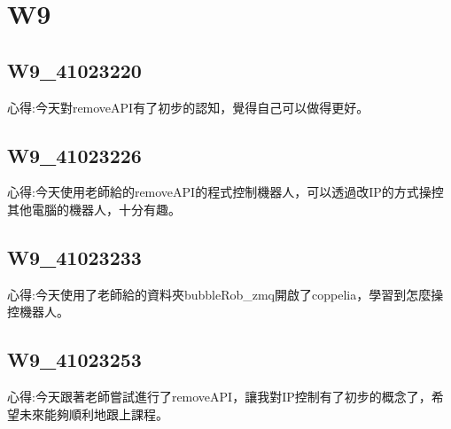 \chapter{W9}


\section{W9\_41023220}

心得:今天對removeAPI有了初步的認知，覺得自己可以做得更好。

\section{W9\_41023226}

心得:今天使用老師給的removeAPI的程式控制機器人，可以透過改IP的方式操控其他電腦的機器人，十分有趣。

\section{W9\_41023233}

心得:今天使用了老師給的資料夾bubbleRob_zmq開啟了coppelia，學習到怎麼操控機器人。

\section{W9\_41023253}

心得:今天跟著老師嘗試進行了removeAPI，讓我對IP控制有了初步的概念了，希望未來能夠順利地跟上課程。

